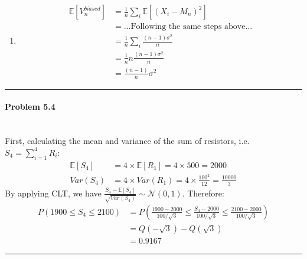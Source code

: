 \documentclass[12pt, letterpaper]{scrartcl}
\begin{document}
\begin{enumerate}[((a))]
    \item
    \begin{align*}
        \mathbb{E}[V^{biased}_n]&=\frac{1}{n}\sum_i\mathbb{E}[(X_i-M_n)^2]\\
        &=\dots \text{Following the same steps above} \dots\\
        &=\frac{1}{n}\sum_i\frac{(n-1)\sigma^2}{n}\\
        &=\frac{1}{n}n\frac{(n-1)\sigma^2}{n}\\
        &=\frac{(n-1)}{n}\sigma^2
    \end{align*}
\end{enumerate}
 
\hrule

\paragraph*{Problem 5.4} \hfill\\
First, calculating the mean and variance of the sum of resistors, i.e. $S_4=\sum_{i=1}^4 R_i$:
\begin{align*}
    \mathbb{E}[S_4]&=4\times\mathbb{E}[R_1]=4\times500=2000\\
    Var(S_4)&=4\times Var(R_1)=4\times\frac{100^2}{12}=\frac{10000}{3}
\end{align*}
By applying CLT, we have $\frac{S_4-\mathbb{E}[S_4]}{\sqrt{Var(S_4)}}\sim \mathcal{N}(0,1)$. Therefore:
\begin{align*}
    P(1900\leq S_4\leq2100)&=P(\frac{1900-2000}{100/\sqrt{3}}\leq\frac{S_4-2000}{100/\sqrt{3}}\leq\frac{2100-2000}{100/\sqrt{3}})\\
    &=Q(-\sqrt{3})-Q(\sqrt{3})\\
    &=0.9167
\end{align*}
\hrule
\end{document}
